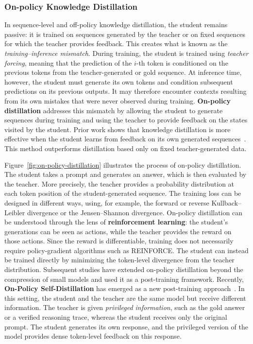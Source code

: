 \subsubsection{On-policy Knowledge Distillation}
In sequence-level and off-policy knowledge distillation, the student remains passive: 
it is trained on sequences generated by the teacher or on fixed sequences for which 
the teacher provides feedback. This creates what is known as the \textit{training--inference mismatch}.
During training, the student is trained using \textit{teacher forcing}, meaning that 
the prediction of the $i$-th token is conditioned on the previous tokens from 
the teacher-generated or gold sequence. At inference time, however, 
the student must generate its own tokens and condition subsequent predictions 
on its previous outputs. It may therefore encounter contexts resulting 
from its own mistakes that were never observed during training.
\textbf{On-policy distillation} addresses this mismatch by allowing the student to generate 
sequences during training and using the teacher to provide feedback on the states 
visited by the student. Prior work shows that knowledge distillation
is more effective when the student learns from feedback on its own generated sequences~\citep{agarwal2024onpolicy}.
This method outperforms distillation based only on fixed teacher-generated data.

Figure~\ref{fig:on-policy-distillation} illustrates the process of on-policy distillation. 
The student takes a prompt and generates an answer, which is then evaluated by 
the teacher. More precisely, the teacher provides a probability distribution at each 
token position of the student-generated sequence. The training loss can be designed 
in different ways, using, for example, the forward or reverse Kullback--Leibler 
divergence or the Jensen--Shannon divergence.
On-policy distillation can be understood through the lens of \textbf{reinforcement learning}: 
the student's generations can be seen as actions, while the teacher provides the
reward on those actions. Since the reward is differentiable, training
does not necessarily require policy-gradient algorithms such as REINFORCE.
The student can instead be trained directly by minimizing the token-level divergence 
from the teacher distribution.
Subsequent studies have extended on-policy distillation beyond the compression
of small models and used it as a post-training framework. Recently, 
\textbf{On-Policy Self-Distillation} has emerged as a new post-training 
approach~\citep{zhao2026selfdistilled}. In this setting, the student and 
the teacher are the same model but receive different information. 
The teacher is given \textit{privileged information}, such as the gold answer 
or a verified reasoning trace, whereas the student receives only the original prompt. 
The student generates its own response, and the privileged version of the model 
provides dense token-level feedback on this response. 

